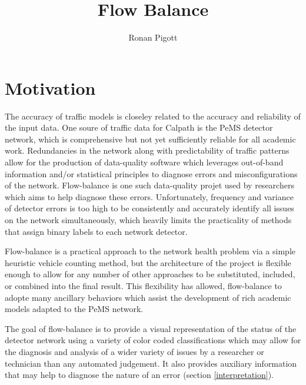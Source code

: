 \documentclass[titlepage]{article}
\begin{document}
\title{Flow Balance}
\author{Ronan Pigott}
\maketitle
\addtocounter{page}{1}

\tableofcontents
\newpage

\section{Motivation}\label{motivation}
The accuracy of traffic models is closeley related to the accuracy and reliability of the input data. One soure of traffic data for Calpath is the PeMS detector network, which is comprehensive but not yet sufficiently reliable for all academic work. Redundancies in the network along with predictability of traffic patterns allow for the production of data-quality software which leverages out-of-band information and/or statistical principles to diagnose errors and misconfigurations of the network. Flow-balance is one such data-quality projet used by researchers which aims to help diagnose these errors. Unfortunately, frequency and variance of detector errors is too high to be consistently and accurately identify all issues on the network simultaneously, which heavily limits the practicality of methods that assign binary labels to each network detector.

Flow-balance is a practical approach to the network health problem via a simple heuristic vehicle counting method, but the architecture of the project is flexible enough to allow for any number of other approaches to be substituted, included, or combined into the final result. This flexibility has allowed, flow-balance to adopte many ancillary behaviors which assist the development of rich academic models adapted to the PeMS network.

The goal of flow-balance is to provide a visual representation of the status of the detector network using a variety of color coded classifications which may allow for the diagnosis and analysis of a wider variety of issues by a researcher or technician than any automated judgement. It also provides auxiliary information that may help to diagnose the nature of an error (section \ref{interpretation}).
\end{document}
